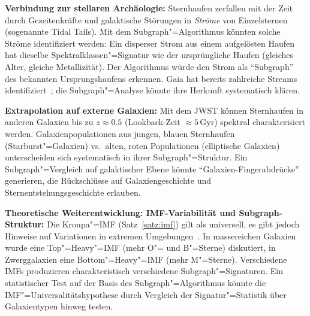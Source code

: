 ﻿\documentclass[a4paper,12pt]{article}
\theoremstyle{definition}
\begin{document}
\textbf{Verbindung zur stellaren Archäologie:}
Sternhaufen zerfallen mit der Zeit durch Gezeitenkräfte und
galaktische Störungen in \emph{Ströme} von Einzelsternen
(sogenannte Tidal Tails). Mit dem Subgraph"=Algorithmus könnten
solche Ströme identifiziert werden: Ein disperser Strom aus einem
aufgelösten Haufen hat dieselbe Spektralklassen"=Signatur wie der
ursprüngliche Haufen (gleiches Alter, gleiche Metallizität).
Der Algorithmus würde den Strom als ``Subgraph'' des bekannten
Ursprungshaufens erkennen. Gaia hat bereits zahlreiche Streams
identifiziert~\cite{ibata2021}; die Subgraph"=Analyse könnte ihre
Herkunft systematisch klären.

\textbf{Extrapolation auf externe Galaxien:}
Mit dem JWST können Sternhaufen in anderen Galaxien bis zu
$z \approx 0.5$ (Lookback-Zeit $\approx 5\,\text{Gyr}$) spektral
charakterisiert werden. Galaxienpopulationen aus jungen, blauen
Sternhaufen (Starburst"=Galaxien) vs.\ alten, roten Populationen
(elliptische Galaxien) unterscheiden sich systematisch in ihrer
Subgraph"=Struktur. Ein Subgraph"=Vergleich auf galaktischer Ebene
könnte ``Galaxien-Fingerabdrücke'' generieren, die Rückschlüsse auf
Galaxiengeschichte und Sternentstehungsgeschichte erlauben.

\textbf{Theoretische Weiterentwicklung: IMF-Variabilität und Subgraph-Struktur:}
Die Kroupa"=IMF (Satz~\ref{satz:imf}) gilt als universell, es gibt jedoch
Hinweise auf Variationen in extremen Umgebungen~\cite{kroupa2001}.
In massereichen Galaxien wurde eine Top"=Heavy"=IMF (mehr O"= und B"=Sterne)
diskutiert, in Zwerggalaxien eine Bottom"=Heavy"=IMF (mehr M"=Sterne).
Verschiedene IMFs produzieren charakteristisch verschiedene Subgraph"=Signaturen.
Ein statistischer Test auf der Basis des Subgraph"=Algorithmus könnte die
IMF"=Universalitätshypothese durch Vergleich der Signatur"=Statistik über
Galaxientypen hinweg testen.
\end{document}

